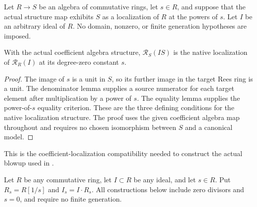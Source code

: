 \endgroup

\begingroup

Let $R\to S$ be an algebra of commutative rings, let $s\in R$,
and suppose that the actual structure map exhibits $S$ as a
localization of $R$ at the powers of $s$. Let $I$ be an
arbitrary ideal of $R$. No domain, nonzero, or finite generation
hypotheses are imposed.

\begin{theorem}
\label{thm:rees-coefficient-localization}
\leanok
With the actual coefficient algebra structure,
$\mathcal R_S(IS)$ is the native localization of
$\mathcal R_R(I)$ at its degree-zero constant $s$.
\end{theorem}
\begin{proof}
The image of $s$ is a unit in $S$, so its further image in
the target Rees ring is a unit. The denominator lemma supplies
a source numerator for each target element after multiplication
by a power of $s$. The equality lemma supplies the power-of-$s$
equality criterion. These are the three defining conditions
for the native localization structure. The proof uses the
given coefficient algebra map throughout and requires no
chosen isomorphism between $S$ and a canonical model.
\end{proof}
\endgroup

\begingroup

This is the coefficient-localization compatibility needed to construct the
actual blowup used in \cite[4.8]{deJong}.

Let $R$ be any commutative ring, let $I\subset R$ be any ideal, and let
$s\in R$. Put $R_s=R[1/s]$ and $I_s=I\cdot R_s$. All constructions below
include zero divisors and $s=0$, and require no finite generation.

